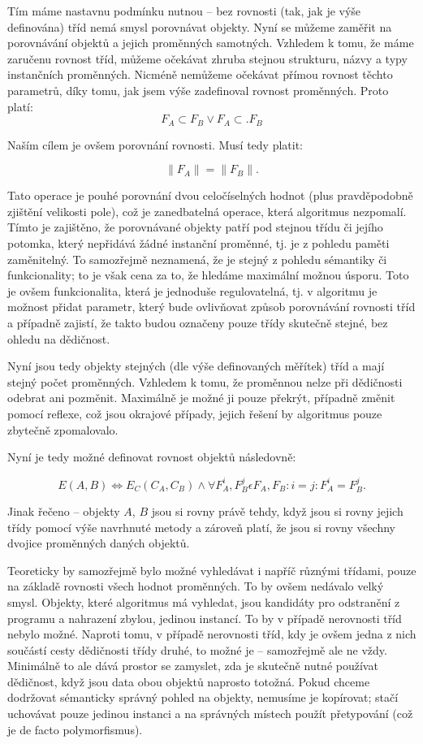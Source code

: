 Tím máme nastavnu podmínku nutnou -- bez rovnosti (tak, jak je výše definována) tříd nemá smysl porovnávat objekty. Nyní se můžeme zaměřit na porovnávání objektů a jejich proměnných samotných. Vzhledem k tomu, že máme zaručenu rovnost tříd, můžeme očekávat zhruba stejnou strukturu, názvy a typy instančních proměnných. Nicméně nemůžeme očekávat přímou rovnost těchto parametrů, díky tomu, jak jsem výše zadefinoval rovnost proměnných. Proto platí:
    $$ F_A \subset F_B \vee F_A \subset. F_B $$

Naším cílem je ovšem porovnání rovnosti. Musí tedy platit:

    $$ \|F_A\| = \|F_B\|.$$

Tato operace je pouhé porovnání dvou celočíselných hodnot (plus pravděpodobně zjištění velikosti pole), což je zanedbatelná operace, která algoritmus nezpomalí. Tímto je zajištěno, že porovnávané objekty patří pod stejnou třídu či jejího potomka, který nepřidává žádné instanční proměnné, tj. je z pohledu paměti zaměnitelný. To samozřejmě neznamená, že je stejný z pohledu sémantiky či funkcionality; to je však cena za to, že hledáme maximální možnou úsporu. Toto je ovšem funkcionalita, která je jednoduše regulovatelná, tj. v algoritmu je možnost přidat parametr, který bude ovlivňovat způsob porovnávání rovnosti tříd a případně zajistí, že takto budou označeny pouze třídy skutečně stejné, bez ohledu na dědičnost.

Nyní jsou tedy objekty stejných (dle výše definovaných měřítek) tříd a mají stejný počet proměnných. Vzhledem k tomu, že proměnnou nelze při dědičnosti odebrat ani pozměnit. Maximálně je možné ji pouze překrýt, případně změnit pomocí reflexe, což jsou okrajové případy, jejich řešení by algoritmus pouze zbytečně zpomalovalo.

Nyní je tedy možné definovat rovnost objektů následovně:

    $$ E(A, B) \Leftrightarrow E_C(C_A, C_B) \wedge \forall F_A^i, F_B^j \epsilon F_A, F_B: i = j: F_A^i = F_B^j.$$

Jinak řečeno -- objekty $A$, $B$ jsou si rovny právě tehdy, když jsou si rovny jejich třídy pomocí výše navrhnuté metody a zároveň platí, že jsou si rovny všechny dvojice proměnných daných objektů. 

Teoreticky by samozřejmě bylo možné vyhledávat i napříč různými třídami, pouze na základě rovnosti všech hodnot proměnných. To by ovšem nedávalo velký smysl. Objekty, které algoritmus má vyhledat, jsou kandidáty pro odstranění z programu a nahrazení zbylou, jedinou instancí. To by v případě nerovnosti tříd nebylo možné. Naproti tomu, v případě nerovnosti tříd, kdy je ovšem jedna z nich součástí cesty dědičnosti třídy druhé, to možné je -- samozřejmě ale ne vždy. Minimálně to ale dává prostor se zamyslet, zda je skutečně nutné používat dědičnost, když jsou data obou objektů naprosto totožná. Pokud chceme dodržovat sémanticky správný pohled na objekty, nemusíme je kopírovat; stačí uchovávat pouze jedinou instanci a na správných místech použít přetypování (což je de facto polymorfismus).


